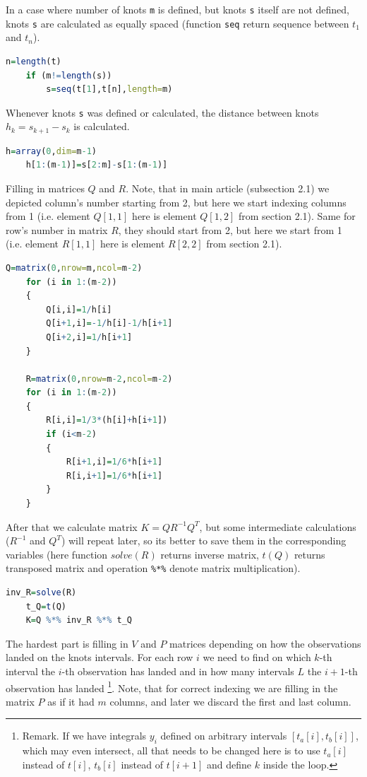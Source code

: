\documentclass[a4paper,10pt]{article}
\begin{document}
In a case where number of knots \lstinline|m| is defined, but knots \lstinline|s| itself are not defined, knots \lstinline|s| are calculated as equally spaced (function \lstinline|seq| return sequence between $t_1$ and $t_n$).
%
\begin{lstlisting}[language=R]
	n=length(t)
	if (m!=length(s)) 
		s=seq(t[1],t[n],length=m)
\end{lstlisting}
%
Whenever knots \lstinline|s| was defined or calculated, the distance between knots $h_k=s_{k+1}-s_k$ is calculated.
%
\begin{lstlisting}[language=R]   
	h=array(0,dim=m-1)
	h[1:(m-1)]=s[2:m]-s[1:(m-1)]
\end{lstlisting}
%
Filling in matrices $Q$ and $R$. 
Note, that in main article (subsection 2.1) we depicted column's number starting from 2, but here we start indexing columns from 1 (i.e. element $Q[1,1]$ here is element $Q[1,2]$ from section 2.1).
Same for row's number in matrix $R$, they should start from 2, but here we start from 1 (i.e. element $R[1,1]$ here is element $R[2,2]$ from section 2.1).
%
\begin{lstlisting}[language=R]
	Q=matrix(0,nrow=m,ncol=m-2)
	for (i in 1:(m-2))
	{
		Q[i,i]=1/h[i]
		Q[i+1,i]=-1/h[i]-1/h[i+1]
		Q[i+2,i]=1/h[i+1]
	}	

	R=matrix(0,nrow=m-2,ncol=m-2)
	for (i in 1:(m-2))
	{
		R[i,i]=1/3*(h[i]+h[i+1])
		if (i<m-2)
		{
			R[i+1,i]=1/6*h[i+1]
			R[i,i+1]=1/6*h[i+1]
		}
	}	
\end{lstlisting}
%
After that we calculate matrix $K=QR^{-1}Q^T$, but some intermediate calculations ($R^{-1}$ and $Q^T$) will repeat later, so its better to save them in the corresponding variables (here function $solve(R)$ returns inverse matrix, $t(Q)$ returns transposed matrix and operation \lstinline|%*%| denote matrix multiplication).
%
\begin{lstlisting}[language=R]
	inv_R=solve(R)  
	t_Q=t(Q)
	K=Q %*% inv_R %*% t_Q
\end{lstlisting} 
%
The hardest part is filling in $V$ and $P$ matrices depending on how the observations landed on the knots intervals. 
For each row $i$ we need to find on which $k$-th interval the $i$-th observation has landed and in how many intervals $L$ the $i+1$-th observation has landed \footnote{Remark. If we have integrals $y_i$ defined on arbitrary intervals $[t_a[i],t_b[i]]$, which may even intersect, all that needs to be changed here is to use $t_a[i]$ instead of $t[i]$, $t_b[i]$ instead of $t[i+1]$ and define $k$ inside the loop. }.
Note, that for correct indexing we are filling in the matrix $P$ as if it had $m$ columns, and later we discard the first and last column. 
\end{document}
